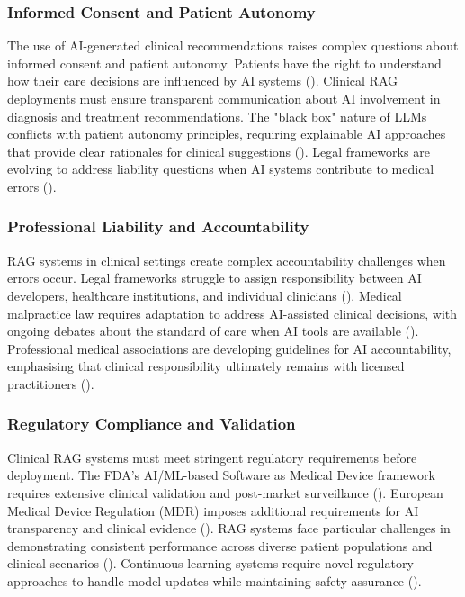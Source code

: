 \subsubsection{Informed Consent and Patient Autonomy}
The use of AI-generated clinical recommendations raises complex questions about informed consent and patient autonomy. Patients have the right to understand how their care decisions are influenced by AI systems (\citep{beauchamp2019principles}). Clinical RAG deployments must ensure transparent communication about AI involvement in diagnosis and treatment recommendations. The "black box" nature of LLMs conflicts with patient autonomy principles, requiring explainable AI approaches that provide clear rationales for clinical suggestions (\citep{holzinger2017makes}). Legal frameworks are evolving to address liability questions when AI systems contribute to medical errors (\citep{price2019black}).

\subsubsection{Professional Liability and Accountability}
RAG systems in clinical settings create complex accountability challenges when errors occur. Legal frameworks struggle to assign responsibility between AI developers, healthcare institutions, and individual clinicians (\citep{futoma2020myth}). Medical malpractice law requires adaptation to address AI-assisted clinical decisions, with ongoing debates about the standard of care when AI tools are available (\citep{kesselheim2019artificial}). Professional medical associations are developing guidelines for AI accountability, emphasising that clinical responsibility ultimately remains with licensed practitioners (\citep{ama2018augmented}).

\subsubsection{Regulatory Compliance and Validation}
Clinical RAG systems must meet stringent regulatory requirements before deployment. The FDA's AI/ML-based Software as Medical Device framework requires extensive clinical validation and post-market surveillance (\citep{fda2021artificial}). European Medical Device Regulation (MDR) imposes additional requirements for AI transparency and clinical evidence (\citep{eu2017mdr}). RAG systems face particular challenges in demonstrating consistent performance across diverse patient populations and clinical scenarios (\citep{sendak2020real}). Continuous learning systems require novel regulatory approaches to handle model updates while maintaining safety assurance (\citep{scott2021regulation}).

